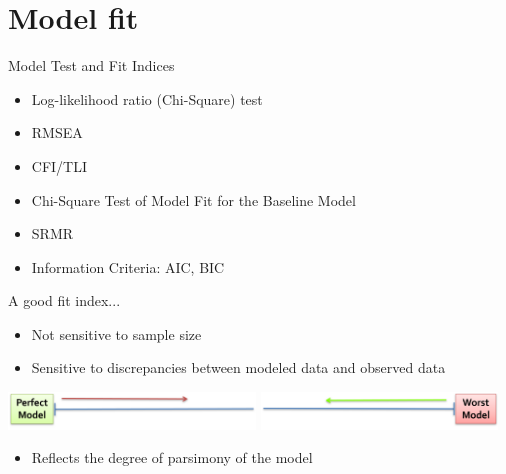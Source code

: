 \documentclass[10pt]{beamer}\usepackage[]{graphicx}\usepackage[]{xcolor}
\begin{document}
\section{Model fit}
%
\begin{frame}{Model Test and Fit Indices}

\begin{itemize}
  \item{Log-likelihood ratio (Chi-Square) test}
  \item{RMSEA}
  \item{CFI/TLI}
  \item{Chi-Square Test of Model Fit for the Baseline Model}
  \item{SRMR}
  \item{Information Criteria: AIC, BIC}
\end{itemize}
\end{frame}
%
\begin{frame}{A good fit index...}
\begin{itemize}
  \item{Not sensitive to sample size}
  \item{Sensitive to discrepancies between modeled data and observed data}
\end{itemize}
\vspace*{1cm}
\includegraphics[height=1cm,keepaspectratio=T] {perfect_fit.png}
\hfill
\hspace*{5cm}\includegraphics[height=1cm,keepaspectratio=T] {worst_fit.png}
\vspace*{1cm}
\begin{itemize}
\item{Reflects the degree of parsimony of the model}
\end{itemize}
\end{frame}
%
\end{document}
